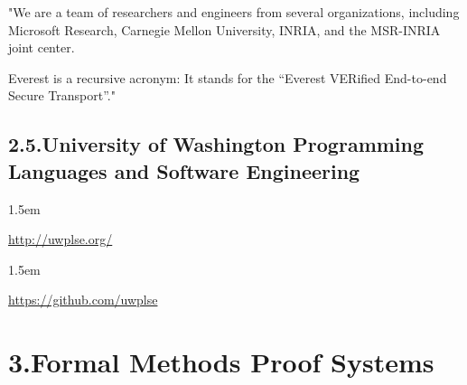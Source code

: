 \documentclass[12pt,twoside]{article}
\begin{document}
\noindent{}"We are a team of researchers and engineers from several
organizations, including Microsoft Research, Carnegie Mellon
University, INRIA, and the MSR-INRIA joint center.%

Everest is a recursive acronym: It stands for the “Everest VERified
End-to-end Secure Transport”."%

\subsection{2.5.\hspace*{0.5em}University of Washington Programming Languages and Software Engineering}\label{sec-university-of-washington-programming-languages-and-software-engineering}%

\begin{mddefinitions}%


\begin{mdbmarginx}{}{}{}{1.5em}%
\begin{mddefdata}%
\href{http://uwplse.org/}{{\ttfamily http://\hspace{0pt}uwplse.\hspace{0pt}org/\hspace{0pt}}}
\end{mddefdata}%
\end{mdbmarginx}%


\begin{mdbmarginx}{}{}{}{1.5em}%
\begin{mddefdata}%
\href{https://github.com/uwplse}{{\ttfamily https://\hspace{0pt}github.\hspace{0pt}com/\hspace{0pt}uwplse}}%
\end{mddefdata}%
\end{mdbmarginx}%
\end{mddefinitions}%

\section{3.\hspace*{0.5em}Formal Methods Proof Systems}\label{sec-formal-methods-proof-systems}%
\end{document}

